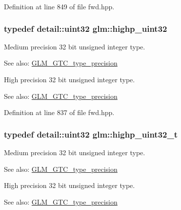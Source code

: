 Definition at line 849 of file fwd.hpp.\hypertarget{group__gtc__type__precision_g3145e44c73e2df7dfe4f3cb65974bf22}{
\subsubsection[highp\_\-uint32]{\setlength{\rightskip}{0pt plus 5cm}typedef detail::uint32 {\bf glm::highp\_\-uint32}}}
\label{group__gtc__type__precision_g3145e44c73e2df7dfe4f3cb65974bf22}


Medium precision 32 bit unsigned integer type. \begin{Desc}
\item[See also:]\hyperlink{group__gtc__type__precision}{GLM\_\-GTC\_\-type\_\-precision}\end{Desc}
High precision 32 bit unsigned integer type. \begin{Desc}
\item[See also:]\hyperlink{group__gtc__type__precision}{GLM\_\-GTC\_\-type\_\-precision} \end{Desc}


Definition at line 837 of file fwd.hpp.\hypertarget{group__gtc__type__precision_g8eb85ad460079c63b68866ae34637bda}{
\subsubsection[highp\_\-uint32\_\-t]{\setlength{\rightskip}{0pt plus 5cm}typedef detail::uint32 {\bf glm::highp\_\-uint32\_\-t}}}
\label{group__gtc__type__precision_g8eb85ad460079c63b68866ae34637bda}


Medium precision 32 bit unsigned integer type. \begin{Desc}
\item[See also:]\hyperlink{group__gtc__type__precision}{GLM\_\-GTC\_\-type\_\-precision}\end{Desc}
High precision 32 bit unsigned integer type. \begin{Desc}
\item[See also:]\hyperlink{group__gtc__type__precision}{GLM\_\-GTC\_\-type\_\-precision} \end{Desc}


